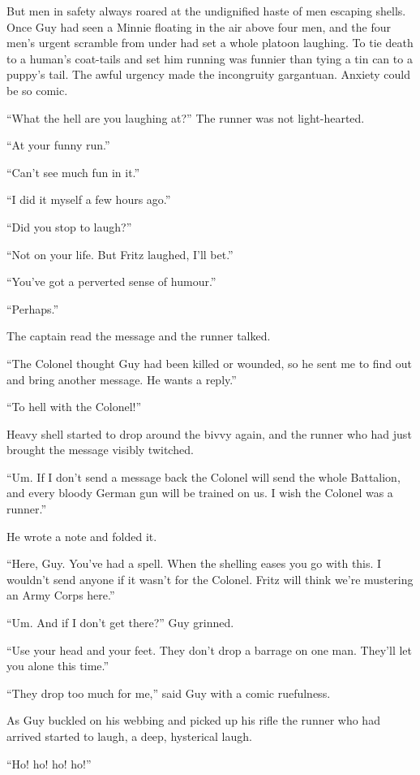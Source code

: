 But men in safety always roared at the undignified haste of men escaping shells. Once Guy had seen a Minnie floating in the air above four men, and the four men's urgent scramble from under had set a whole platoon laughing. To tie death to a human's coat-tails and set him running was funnier than tying a tin can to a puppy's tail. The awful urgency made the incongruity gargantuan. Anxiety could be so comic.

``What the hell are you laughing at?'' The runner was not light-hearted.

``At your funny run.''

``Can't see much fun in it.''

``I did it myself a few hours ago.''

``Did you stop to laugh?''

``Not on your life. But Fritz laughed, I'll bet.''

``You've got a perverted sense of humour.''

``Perhaps.''

The captain read the message and the runner talked.

``The Colonel thought Guy had been killed or wounded, so he sent me to find out and bring another message. He wants a reply.''

``To hell with the Colonel!''

Heavy shell started to drop around the bivvy again, and the runner who had just brought the message visibly twitched.

``Um. If I don't send a message back the Colonel will send the whole Battalion, and every bloody German gun will be trained on us. I wish the Colonel was a runner.''

He wrote a note and folded it.

``Here, Guy. You've had a spell. When the shelling eases you go with this. I wouldn't send anyone if it wasn't for the Colonel. Fritz will think we're mustering an Army Corps here.''

``Um. And if I don't get there?'' Guy grinned.

``Use your head and your feet. They don't drop a barrage on one man. They'll let you alone this time.''

``They drop too much for me,'' said Guy with a comic ruefulness.

As Guy buckled on his webbing and picked up his rifle the runner who had arrived started to laugh, a deep, hysterical laugh.

``Ho! ho! ho! ho!''

